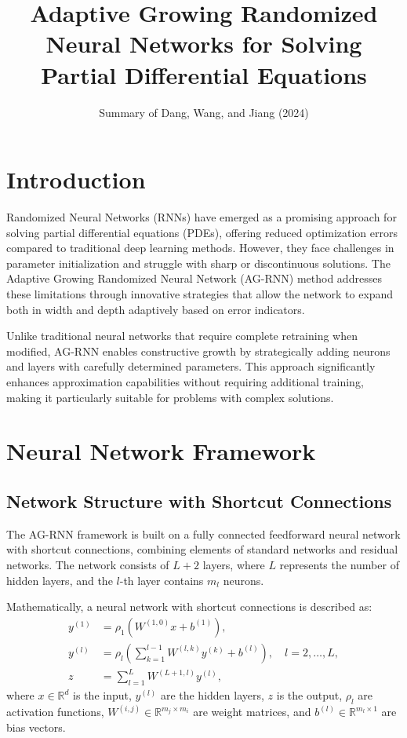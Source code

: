 \documentclass[11pt,a4paper]{article}
\title{Adaptive Growing Randomized Neural Networks for Solving Partial Differential Equations}
\author{Summary of Dang, Wang, and Jiang (2024)}
\date{}
\begin{document}
\maketitle

\section{Introduction}

Randomized Neural Networks (RNNs) have emerged as a promising approach for solving partial differential equations (PDEs), offering reduced optimization errors compared to traditional deep learning methods. However, they face challenges in parameter initialization and struggle with sharp or discontinuous solutions. The Adaptive Growing Randomized Neural Network (AG-RNN) method addresses these limitations through innovative strategies that allow the network to expand both in width and depth adaptively based on error indicators.

Unlike traditional neural networks that require complete retraining when modified, AG-RNN enables constructive growth by strategically adding neurons and layers with carefully determined parameters. This approach significantly enhances approximation capabilities without requiring additional training, making it particularly suitable for problems with complex solutions.

\section{Neural Network Framework}

\subsection{Network Structure with Shortcut Connections}

The AG-RNN framework is built on a fully connected feedforward neural network with shortcut connections, combining elements of standard networks and residual networks. The network consists of $L+2$ layers, where $L$ represents the number of hidden layers, and the $l$-th layer contains $m_l$ neurons.

Mathematically, a neural network with shortcut connections is described as:
\begin{align}
y^{(1)} &= \rho_1\left(W^{(1,0)}x + b^{(1)}\right), \\
y^{(l)} &= \rho_l\left(\sum_{k=1}^{l-1} W^{(l,k)}y^{(k)} + b^{(l)}\right), \quad l = 2,\ldots,L, \\
z &= \sum_{l=1}^{L} W^{(L+1,l)}y^{(l)},
\end{align}
where $x \in \mathbb{R}^d$ is the input, $y^{(l)}$ are the hidden layers, $z$ is the output, $\rho_l$ are activation functions, $W^{(i,j)} \in \mathbb{R}^{m_j \times m_i}$ are weight matrices, and $b^{(l)} \in \mathbb{R}^{m_l \times 1}$ are bias vectors.
\end{document}
